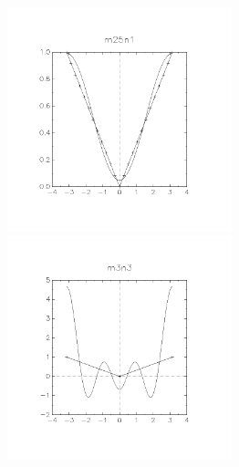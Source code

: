 \documentclass[11pt, a4paper, titlepage, openright]{article}
\begin{document}
    \begin{figure}[H]
        \begin{minipage}[b]{0.49\textwidth}
            \includegraphics[width=6.5cm, trim={2cm, 4cm, 2cm, 3cm}, clip]{../absImages/m25n1}
        \end{minipage}
        \hfill
        \begin{minipage}[b]{0.49\textwidth}
            \includegraphics[width=6.5cm, trim={2cm, 4cm, 2cm, 3cm}, clip]{../absImages/m3n3}
        \end{minipage}
    \end{figure}
\end{document}
